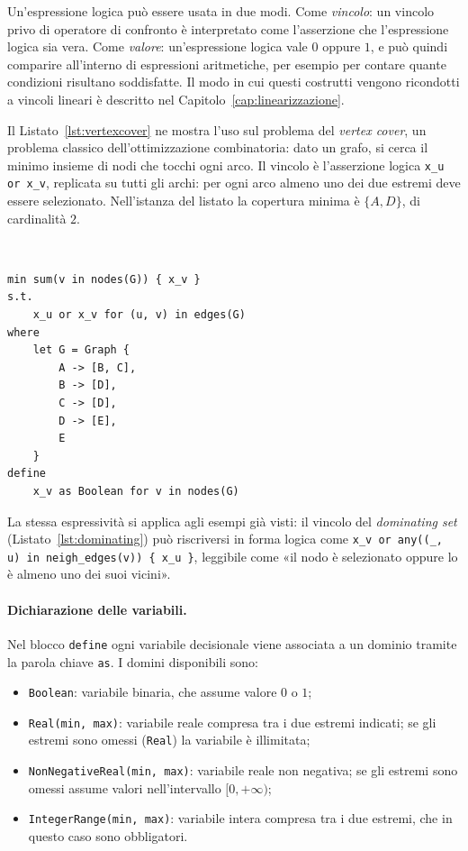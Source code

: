 Un'espressione logica può essere usata in due modi. Come \emph{vincolo}: un
vincolo privo di operatore di confronto è interpretato come l'asserzione che
l'espressione logica sia vera. Come \emph{valore}: un'espressione logica vale
$0$ oppure $1$, e può quindi comparire all'interno di espressioni aritmetiche,
per esempio per contare quante condizioni risultano soddisfatte. Il modo in cui
questi costrutti vengono ricondotti a vincoli lineari è descritto nel
Capitolo~\ref{cap:linearizzazione}.

Il Listato~\ref{lst:vertexcover} ne mostra l'uso sul problema del \emph{vertex
cover}, un problema classico dell'ottimizzazione combinatoria: dato un grafo,
si cerca il minimo insieme di nodi che tocchi ogni arco. Il vincolo è
l'asserzione logica \texttt{x\_u or x\_v}, replicata su tutti gli archi: per
ogni arco almeno uno dei due estremi deve essere selezionato. Nell'istanza del
listato la copertura minima è $\{A, D\}$, di cardinalità $2$.

\

\begin{lstlisting}[caption={Il problema del vertex cover in ROOC, con un vincolo logico.}, label={lst:vertexcover}]
min sum(v in nodes(G)) { x_v }
s.t.
    x_u or x_v for (u, v) in edges(G)
where
    let G = Graph {
        A -> [B, C],
        B -> [D],
        C -> [D],
        D -> [E],
        E
    }
define
    x_v as Boolean for v in nodes(G)
\end{lstlisting}

La stessa espressività si applica agli esempi già visti: il vincolo del
\emph{dominating set} (Listato~\ref{lst:dominating}) può riscriversi in forma
logica come \texttt{x\_v or any((\_, u) in neigh\_edges(v)) \{ x\_u \}},
leggibile come «il nodo è selezionato oppure lo è almeno uno dei suoi vicini».

\paragraph{Dichiarazione delle variabili.}
Nel blocco \texttt{define} ogni variabile decisionale viene associata a un
dominio tramite la parola chiave \texttt{as}. I domini disponibili sono:

\begin{itemize}
  \item \texttt{Boolean}: variabile binaria, che assume valore $0$ o $1$;
  \item \texttt{Real(min, max)}: variabile reale compresa tra i due estremi
        indicati; se gli estremi sono omessi (\texttt{Real}) la variabile è
        illimitata;
  \item \texttt{NonNegativeReal(min, max)}: variabile reale non negativa; se gli
        estremi sono omessi assume valori nell'intervallo $[0, +\infty)$;
  \item \texttt{IntegerRange(min, max)}: variabile intera compresa tra i due
        estremi, che in questo caso sono obbligatori.
\end{itemize}

